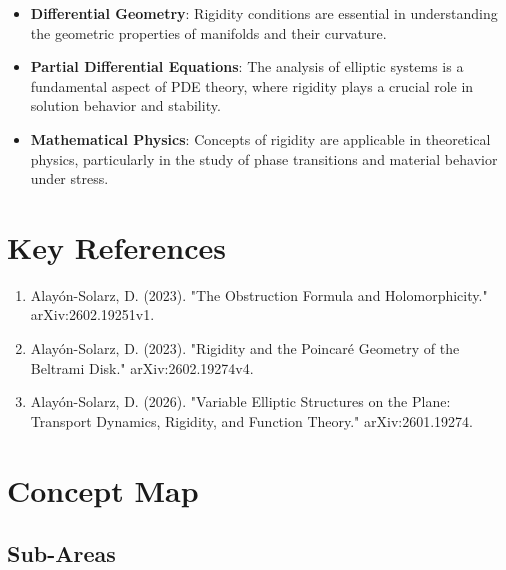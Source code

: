 \documentclass[11pt,a4paper]{article}
\begin{document}
\begin{itemize}
\item \textbf{Differential Geometry}: Rigidity conditions are essential in understanding the geometric properties of manifolds and their curvature.
\end{itemize}

\begin{itemize}
\item \textbf{Partial Differential Equations}: The analysis of elliptic systems is a fundamental aspect of PDE theory, where rigidity plays a crucial role in solution behavior and stability.
\end{itemize}

\begin{itemize}
\item \textbf{Mathematical Physics}: Concepts of rigidity are applicable in theoretical physics, particularly in the study of phase transitions and material behavior under stress.
\end{itemize}

\section{Key References}

\begin{enumerate}
\item Alayón-Solarz, D. (2023). "The Obstruction Formula and Holomorphicity." arXiv:2602.19251v1.
\item Alayón-Solarz, D. (2023). "Rigidity and the Poincaré Geometry of the Beltrami Disk." arXiv:2602.19274v4.
\item Alayón-Solarz, D. (2026). "Variable Elliptic Structures on the Plane: Transport Dynamics, Rigidity, and Function Theory." arXiv:2601.19274.
\end{enumerate}

\section{Concept Map}

\subsection{Sub-Areas}
\end{document}
